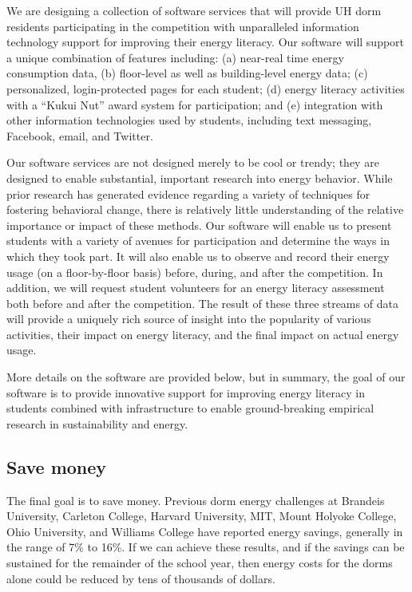 \documentclass[11pt]{article}
\begin{document}
We are designing a collection of software services that will provide UH
dorm residents participating in the competition with unparalleled
information technology support for improving their energy literacy.  Our
software will support a unique combination of features including: (a)
near-real time energy consumption data, (b) floor-level as well as
building-level energy data; (c) personalized, login-protected pages for
each student; (d) energy literacy activities with a ``Kukui Nut'' award
system for participation; and (e) integration with other information
technologies used by students, including text messaging, Facebook, email,
and Twitter.

Our software services are not designed merely to be cool or trendy; they
are designed to enable substantial, important research into energy
behavior. While prior research has generated evidence regarding a variety
of techniques for fostering behavioral change, there is relatively little
understanding of the relative importance or impact of these methods.  Our
software will enable us to present students with a variety of avenues for
participation and determine the ways in which they took part. It will also
enable us to observe and record their energy usage (on a floor-by-floor
basis) before, during, and after the competition.  In addition, we will
request student volunteers for an energy literacy assessment both before
and after the competition.  The result of these three streams of data will
provide a uniquely rich source of insight into the popularity of various
activities, their impact on energy literacy, and the final impact on actual
energy usage.  

More details on the software are provided below, but in summary, the goal
of our software is to provide innovative support for improving energy
literacy in students combined with infrastructure to enable ground-breaking
empirical research in sustainability and energy.

\subsection{Save money}

The final goal is to save money.  Previous dorm energy challenges at
Brandeis University, Carleton College, Harvard University, MIT, Mount
Holyoke College, Ohio University, and Williams College have reported energy
savings, generally in the range of 7\% to 16\%.  If we can achieve these
results, and if the savings can be sustained for the remainder of the
school year, then energy costs for the dorms alone could be reduced by tens
of thousands of dollars.
\end{document}
